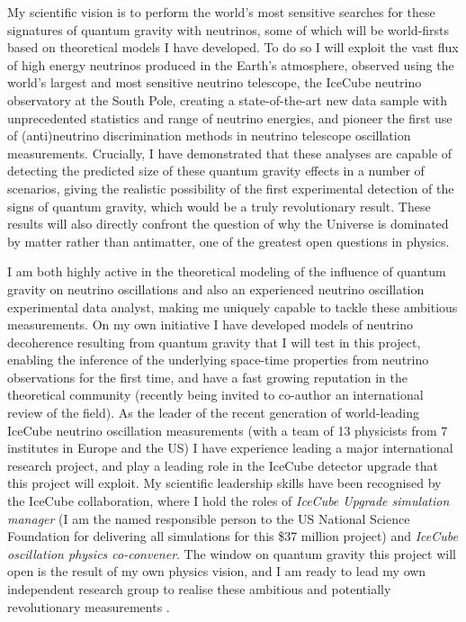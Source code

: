 \documentclass[a4paper,11pt]{article}
\begin{document}
My scientific vision is to perform the world's most sensitive searches for these signatures of quantum gravity with neutrinos, some of which will be world-firsts based on theoretical models I have developed. To do so I will exploit the vast flux of high energy neutrinos produced in the Earth's atmosphere, observed using the world's largest and most sensitive neutrino telescope, the IceCube neutrino observatory at the South Pole, creating a state-of-the-art new data sample with unprecedented statistics and range of neutrino energies, and pioneer the first use of (anti)neutrino discrimination methods in neutrino telescope oscillation measurements. Crucially, I have demonstrated that these analyses are capable of detecting the predicted size of these quantum gravity effects in a number of scenarios, giving the realistic possibility of the first experimental detection of the signs of quantum gravity, which would be a truly revolutionary result. These results will also directly confront the question of why the Universe is dominated by matter rather than antimatter, one of the greatest open questions in physics.

I am both highly active in the theoretical modeling of the influence of quantum gravity on neutrino oscillations and also an experienced neutrino oscillation experimental data analyst, making me uniquely capable to tackle these ambitious measurements. On my own initiative I have developed models of neutrino decoherence resulting from quantum gravity that I will test in this project, enabling the inference of the underlying space-time properties from neutrino observations for the first time, and have a fast growing reputation in the theoretical community (recently being invited to co-author an international review of the field). As the leader of the recent generation of world-leading IceCube neutrino oscillation measurements (with a team of 13 physicists from 7 institutes in Europe and the US) I have experience leading a major international research project, and play a leading role in the IceCube detector upgrade that this project will exploit. My scientific leadership skills have been recognised by the IceCube collaboration, where I hold the roles of \textit{IceCube Upgrade simulation manager} (I am the named responsible person to the US National Science Foundation for delivering all simulations for this \$37 million project) and \textit{IceCube oscillation physics co-convener}. The window on quantum gravity this project will open is the result of my own physics vision, and I am ready to lead my own independent research group to realise these ambitious and potentially revolutionary measurements . \\
\end{document}
